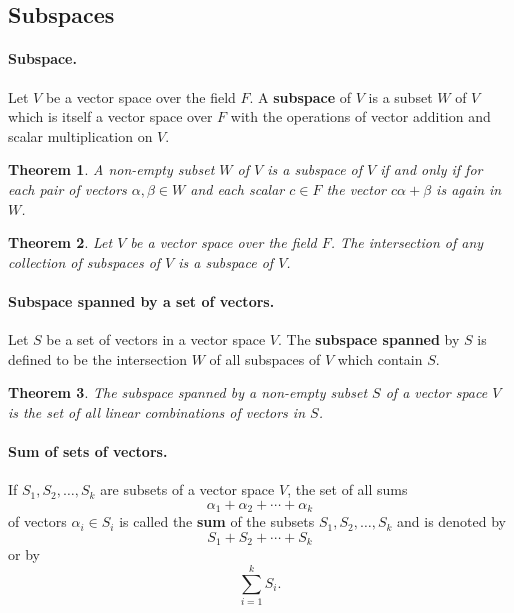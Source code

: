 \documentclass{article}
\newtheorem{theorem}{Theorem}
\begin{document}
\subsection{Subspaces}

\paragraph{Subspace.} Let $V$ be a vector space over the field $F$. A
\textbf{subspace} of $V$ is a subset $W$ of $V$ which is itself a vector space
over $F$ with the operations of vector addition and scalar multiplication on
$V$.

\setcounter{theorem}{0}
\begin{theorem}
  A non-empty subset $W$ of $V$ is a subspace of $V$ if and only if for each
  pair of vectors $\alpha, \beta \in W$ and each scalar $c \in F$ the vector
  $c\alpha + \beta$ is again in $W$.
\end{theorem}

\begin{theorem}
  Let $V$ be a vector space over the field $F$. The intersection of any
  collection of subspaces of $V$ is a subspace of $V$.
\end{theorem}

\paragraph{Subspace spanned by a set of vectors.} Let $S$ be a set of vectors
in a vector space $V$. The \textbf{subspace spanned} by $S$ is defined to be
the intersection $W$ of all subspaces of $V$ which contain $S$.

\begin{theorem}
  The subspace spanned by a non-empty subset $S$ of a vector space $V$ is the
  set of all linear combinations of vectors in $S$.
\end{theorem}

\paragraph{Sum of sets of vectors.} If $S_1, S_2, \ldots, S_k$ are subsets of a
vector space $V$, the set of all sums \[
  \alpha_1 + \alpha_2 + \cdots + \alpha_k
\] of vectors $\alpha_i \in S_i$ is called the \textbf{sum} of the subsets $S_1,
S_2, \ldots, S_k$ and is denoted by \[
  S_1 + S_2 + \cdots + S_k
\] or by \[
  \sum_{i=1}^k S_i.
\]
\end{document}
